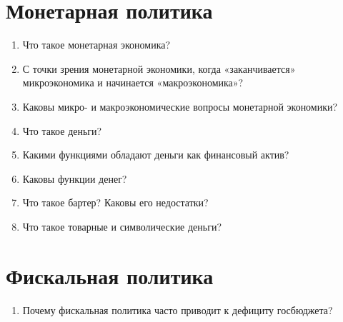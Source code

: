 \documentclass[10pt, a4paper]{extarticle}
\begin{document}
\section{Монетарная политика}
\begin{enumerate}
	\item Что такое монетарная экономика?
	\item С точки зрения монетарной экономики, когда «заканчивается» микроэкономика и начинается «макроэкономика»?
	\item Каковы микро- и макроэкономические вопросы монетарной экономики?
	\item Что такое деньги?
	\item Какими функциями обладают деньги как финансовый актив? 
	\item Каковы функции денег?
	\item Что такое бартер? Каковы его недостатки?
	\item Что такое товарные и символические деньги?
\end{enumerate}

\section{Фискальная политика}
\begin{enumerate}
	\item Почему фискальная политика часто приводит к дефициту госбюджета? 
\end{enumerate}
\end{document}
